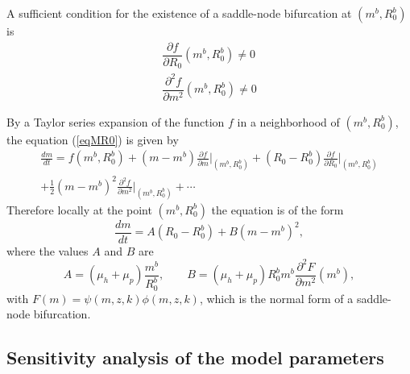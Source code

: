 \documentclass[eng]{MMSB-class-eng}
\begin{document}
{A sufficient condition for the existence of a saddle-node bifurcation at $(m^b,R_0^b)$ is
\begin{equation}
\begin{split}
\dfrac{\partial f }{\partial R_0}(m^b,R_0^b)\neq0\\
\dfrac{\partial^2 f }{\partial m^2}(m^b,R_0^b)\neq0
\end{split}
\end{equation}

By a Taylor series expansion of the function $f$ in a neighborhood of $(m^b,R_0^b)$, the equation (\ref{eqMR0}) is given by
\begin{multline}
	\frac{dm}{dt}=f(m^b,R_0^b)+(m-m^b)\frac{\partial f }{\partial m}\big\vert_{(m^b,R_0^b)}%
	+(R_0-R_0^b){\frac{\partial f }{\partial R_0}\big\vert_{(m^b,R_0^b)}}%
	\\+{\frac {1}{2}}(m-m^b)^2{\frac{\partial^2 f }{\partial m^2}}\big\vert_{(m^b,R_0^b)}%
	+\cdots 
\end{multline}
Therefore locally at the point $(m^b,R_0^b)$ the equation is of the form
\begin{equation}
\dfrac{dm}{dt}=A(R_0- R_0^b)+B(m- m^b)^2,
\end{equation}
where the values $A$ and $B$ are
\begin{equation}
A=(\mu_h +\mu_p)\frac{ m^b}{ R_0^b}, \qquad  B=(\mu_h + \mu_p) R_0^b  m^b \frac{\partial^2 F}{\partial m^2}( m^b),
\end{equation}
with $F(m)= \psi(m,z,k)\phi(m,z, k)$,
which is the normal form of a saddle-node bifurcation.

}



	\subsection{Sensitivity analysis of the model parameters}
	
\end{document}
